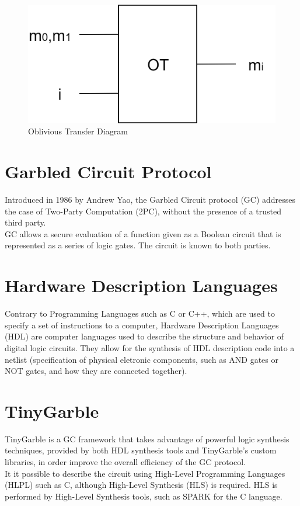 \renewcommand{\figurename}{Figure}
\begin{figure}[H]
\centering
\includegraphics[width=.4\linewidth]{./figures/mpc/OT}
\caption{Oblivious Transfer Diagram}
\label{fig:otscheme}
\end{figure}

\section{Garbled Circuit Protocol}
Introduced in 1986 by Andrew Yao, the Garbled Circuit protocol (GC) addresses the case
of Two-Party Computation (2PC), without the presence of a trusted third party.\\
GC allows a secure evaluation of a function given as a Boolean circuit that is represented as a series of logic gates.
The circuit is known to both parties.\\

\section{Hardware Description Languages}
Contrary to Programming Languages such as C or C++, which are used to specify a set of instructions to a computer, Hardware Description Languages (HDL) are computer languages used to describe the structure and behavior of digital logic circuits. They allow for the synthesis of HDL description code into a netlist (specification of physical eletronic components, such as AND gates or NOT gates, and how they are connected together).

\section{TinyGarble}
TinyGarble is a GC framework that takes advantage of powerful logic synthesis techniques, provided by both HDL synthesis tools
and TinyGarble's custom libraries, in order improve the overall efficiency of the GC protocol.\\
It it possible to describe the circuit using High-Level Programming Languages (HLPL) such as C, although High-Level Synthesis (HLS) is required. HLS is performed by High-Level Synthesis tools, such as SPARK for the C language.

